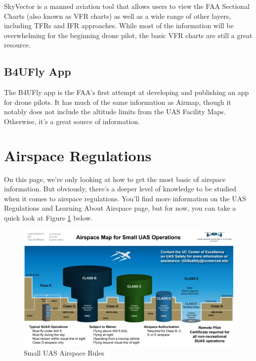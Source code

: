 \documentclass[
]{book}
\begin{document}
SkyVector is a manned aviation tool that allows users to view the FAA Sectional Charts (also known as VFR charts) as well as a wide range of other layers, including TFRs and IFR approaches. While most of the information will be overwhelming for the beginning drone pilot, the basic VFR charts are still a great resource.

\hypertarget{b4ufly-app}{%
\subsection{B4UFly App}\label{b4ufly-app}}

The B4UFly app is the FAA's first attempt at developing and publishing an app for drone pilots. It has much of the same information as Airmap, though it notably does not include the altitude limits from the UAS Facility Maps. Otherwise, it's a great source of information.

\hypertarget{airspace-regulations}{%
\section{Airspace Regulations}\label{airspace-regulations}}

On this page, we're only looking at how to get the most basic of airspace information. But obviously, there's a deeper level of knowledge to be studied when it comes to airspace regulations. You'll find more information on the UAS Regulations and Learning About Airspace page, but for now, you can take a quick look at Figure \ref{fig:SUAS-sim-regs} below.

\begin{figure}

{\centering \includegraphics[width=0.9\linewidth]{images/SUAS_airspace_map} 

}

\caption{Small UAS Airspace Rules}\label{fig:SUAS-sim-regs}
\end{figure}
\end{document}
